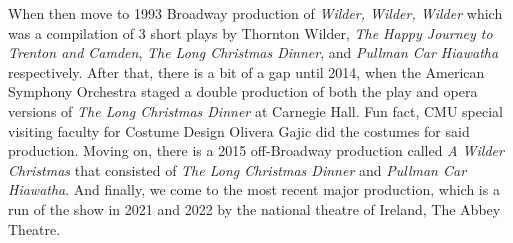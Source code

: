 \documentclass[12pt]{article}
\def\tw{Thornton Wilder}
\begin{document}
\begin{doublespace}
    \par When then move to 1993 Broadway production of \textit{Wilder, Wilder, Wilder} which was a compilation of 3 short plays by \tw , \textit{The Happy Journey to Trenton and Camden}, \textit{The Long Christmas Dinner}, and \textit{Pullman Car Hiawatha} respectively.
    After that, there is a bit of a gap until 2014, when the American Symphony Orchestra staged a double production of both the play and opera versions of \textit{The Long Christmas Dinner} at Carnegie Hall. Fun fact, CMU special visiting faculty for Costume Design Olivera Gajic did the costumes for said production.
    Moving on, there is a 2015 off-Broadway production called \textit{A Wilder Christmas} that consisted of \textit{The Long Christmas Dinner} and \textit{Pullman Car Hiawatha}.
    And finally, we come to the most recent major production, which is a run of the show in 2021 and 2022 by the national theatre of Ireland, The Abbey Theatre.






\newpage
\nocite{*}
\printbibliography[
    title ={Works Cited}
]
\end{doublespace}
\end{document}
